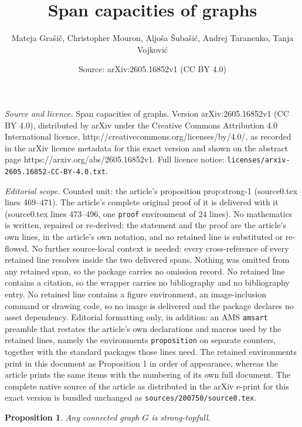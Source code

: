 \documentclass[10pt,a4paper]{amsart}
\title{Span capacities of graphs}
\author{Mateja Gra\v{s}i\v{c}, Christopher Mouron, Aljo\v{s}a \v{S}uba\v{s}i\'c, Andrej Taranenko, Tanja Vojkovi\'c}
\date{Source: arXiv:2605.16852v1 (CC BY 4.0)}
\newtheorem{proposition}{Proposition}
\begin{document}
\maketitle

\noindent\emph{Source and licence.} Span capacities of graphs. Version arXiv:2605.16852v1 (CC BY 4.0), distributed by arXiv under the Creative Commons Attribution 4.0 International licence, http://creativecommons.org/licenses/by/4.0/, as recorded in the arXiv licence metadata for this exact version and shown on the abstract page https://arxiv.org/abs/2605.16852v1. Full licence notice: \texttt{licenses/arxiv-2605.16852-CC-BY-4.0.txt}.\par\smallskip

\noindent\textit{Editorial scope.} Counted unit: the article's proposition prop:strong-1 (source0.tex lines 469--471). The article's complete original proof of it is delivered with it (source0.tex lines 473--496, one \texttt{proof} environment of 24 lines). No mathematics is written, repaired or re-derived: the statement and the proof are the article's own lines, in the article's own notation, and no retained line is substituted or re-flowed.  No further source-local context is needed: every cross-reference of every retained line resolves inside the two delivered spans.  Nothing was omitted from any retained span, so the package carries no omission record.  No retained line contains a citation, so the wrapper carries no bibliography and no bibliography entry.  No retained line contains a figure environment, an image-inclusion command or drawing code, so no image is delivered and the package declares no asset dependency.  Editorial formatting only, in addition: an AMS \texttt{amsart} preamble that restates the article's own declarations and macros used by the retained lines, namely the environments \texttt{proposition} on separate counters, together with the standard packages those lines need.  The retained environments print in this document as Proposition 1 in order of appearance, whereas the article prints the same items with the numbering of its own full document.  The complete native source of the article as distributed in the arXiv e-print for this exact version is bundled unchanged as \texttt{sources/200750/source0.tex}.
\begin{proposition}\label{prop:strong-1}
    Any connected graph $G$ is strong-topfull.
\end{proposition}
\end{document}
